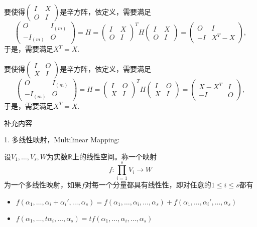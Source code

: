 要使得$\begin{pmatrix} I & X \\ O & I \end{pmatrix}$是辛方阵，依定义，需要满足
$$\begin{pmatrix} O & I_{(m)} \\ -I_{(m)} & O \end{pmatrix} = H = \begin{pmatrix} I & X \\ O & I \end{pmatrix}^T H \begin{pmatrix} I & X \\ O & I \end{pmatrix} = \begin{pmatrix} O & I \\ -I & X^T - X \end{pmatrix},$$
于是，需要满足$X^T = X$.

要使得$\begin{pmatrix} I & O \\ X & I \end{pmatrix}$是辛方阵，依定义，需要满足
$$\begin{pmatrix} O & I_{(m)} \\ -I_{(m)} & O \end{pmatrix} = H = \begin{pmatrix} I & O \\ X & I \end{pmatrix}^T H \begin{pmatrix} I & O \\ X & I \end{pmatrix} = \begin{pmatrix} X - X^T & I \\ -I & O \end{pmatrix},$$
于是，需要满足$X^T = X$.

\newpage

\begin{center}
{\larger 补充内容}
\end{center}

1. 多线性映射，Multilinear Mapping:

设$V_1,\ldots,V_s,W$为实数$\mathbb{R}$上的线性空间。称一个映射
$$f: \prod_{i=1}^s V_i \rightarrow W$$
为一个多线性映射，如果$f$对每一个分量都具有线性性，即对任意的$1\leqslant i \leqslant s$都有
\begin{itemize}
\item $f(\alpha_1,\ldots,\alpha_i+\alpha_i',\ldots,\alpha_s) = f(\alpha_1,\ldots,\alpha_i,\ldots,\alpha_s) + f(\alpha_1,\ldots,\alpha_i',\ldots,\alpha_s)$
\item $f(\alpha_1,\ldots,t\alpha_i,\ldots,\alpha_s) = tf(\alpha_1,\ldots,\alpha_i,\ldots,\alpha_s)$
\end{itemize}

